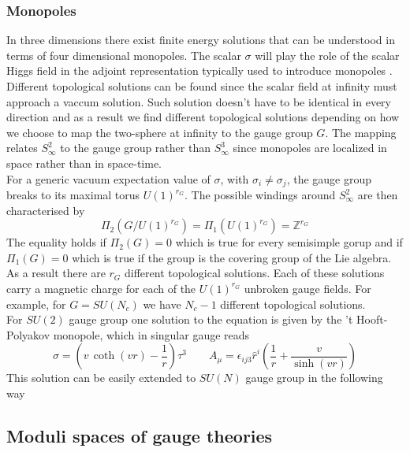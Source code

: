 \subsubsection{Monopoles}
In three dimensions there exist finite energy solutions that can be understood in terms of four dimensional monopoles.
The scalar $\sigma$ will play the role of the scalar Higgs field in the adjoint representation typically used to introduce monopoles \cite{Weinberg:2006rq}.
Different topological solutions can be found since the scalar field at infinity must approach a vaccum solution.
Such solution doesn't have to be identical in every direction and as a result we find different topological solutions depending on how we choose to map the two-sphere at infinity to the gauge group $G$.
The mapping relates $S^2_{\infty}$ to the gauge group rather than $S^3_{\infty}$ since monopoles are localized in space rather than in space-time.\\
For a generic vacuum expectation value of $\sigma$, with $\sigma_i \neq \sigma_j$, the gauge group breaks to its maximal torus $U(1)^{r_G}$.
The possible windings around $S^2_{\infty}$ are then characterised by
\begin{equation}
 \Pi_{2} \left( G / U(1)^{r_G} \right) = \Pi_1 (U(1)^{r_G}) = \mathbb{Z}^{r_G}
\end{equation}
The equality holds if $\Pi_2(G) = 0$ which is true for every semisimple gorup and if $\Pi_1(G) = 0$ which is true if the group is the covering group of the Lie algebra.
As a result there are $r_G$ different topological solutions.
Each of these solutions carry a magnetic charge for each of the $U(1)^{r_G}$ unbroken gauge fields. 
For example, for $G= SU(N_c)$ we have $N_c-1$ different topological solutions.
\\
For $SU(2)$ gauge group one solution to the equation is given by the 't Hooft-Polyakov monopole, which in singular gauge reads
\begin{equation}
  \sigma = \left( v \, \coth (v r) - \frac{1}{r} \right)  \tau^3 \qquad A_{\mu} = \epsilon_{i j 3} \hat{r}^i \left( \frac{1}{r} + \frac{v}{\sinh (vr)} \right)
\end{equation}
This solution can be easily extended to $SU(N)$ gauge group in the following way
 
 
 
 
 
 \subsection{Moduli spaces of gauge theories}

